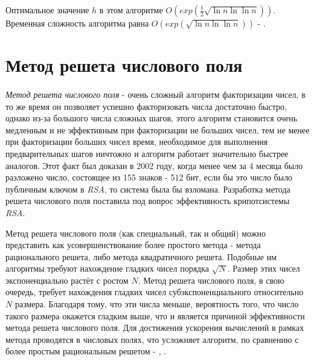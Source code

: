   Оптимальное значение $h$ в этом алгоритме $O(exp(\frac{1}{2}\sqrt{\ln{n}\ln{\ln{n}}}))$. Временная сложность 
  алгоритма равна $O(exp(\sqrt{\ln{n}\ln{\ln{n}}}))$ - \cite[Глава 4, страницы 115-142]{ish11}.

\section{Метод решета числового поля}

\paragraph{} \textit{Метод решета числового поля} - очень сложный алгоритм факторизации чисел, в то же время он позволяет успешно факторизовать числа
  достаточно быстро, однако из-за большого числа сложных шагов, этого алгоритм становится очень медленным и не эффективным при факторизации
  не больших чисел, тем не менее при факторизации больших чисел время, необходимое для выполнения предварительных шагов ничтожно и алгоритм работает
  значительно быстрее аналогов. Этот факт был доказан в 2002 году, когда менее чем за 4 месяца было разложено число, состоящее из 155
  знаков - 512 бит, если бы это число было публичным ключом в \textit{RSA}, то система была бы взломана. Разработка метода решета числового поля 
  поставила под вопрос эффективность крипотсистемы \textit{RSA}.
  
  Метод решета числового поля (как специальный, так и общий) можно представить как усовершенствование более простого метода - метода 
  рационального решета, либо метода квадратичного решета. Подобные им алгоритмы требуют нахождение гладких чисел порядка {$\sqrt{N}$}. 
  Размер этих чисел экспоненциально растёт с ростом {$N$}. Метод решета числового поля, в свою очередь, требует нахождения гладких чисел 
  субэкспоненциального относительно {$N$} размера. Благодаря тому, что эти числа меньше, вероятность того, что число такого размера окажется гладким выше, что и 
  является причиной эффективности метода решета числового поля. Для достижения ускорения вычислений в рамках метода проводятся в числовых 
  полях, что усложняет алгоритм, по сравнению с более простым рациональным решетом - \cite[Глава 5, страницы 145-176]{ish11},
  \cite[Глава 6.4.2, страницы 222-225]{mah06}.
  
